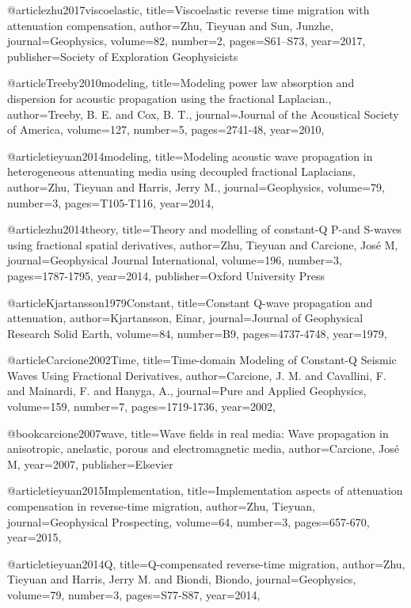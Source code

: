 @article{zhu2017viscoelastic,
  title={Viscoelastic reverse time migration with attenuation compensation},
  author={Zhu, Tieyuan and Sun, Junzhe},
  journal={Geophysics},
  volume={82},
  number={2},
  pages={S61--S73},
  year={2017},
  publisher={Society of Exploration Geophysicists}
}


@article{Treeby2010modeling,
  title={Modeling power law absorption and dispersion for acoustic propagation using the fractional Laplacian.},
  author={Treeby, B. E. and Cox, B. T.},
  journal={Journal of the Acoustical Society of America},
  volume={127},
  number={5},
  pages={2741-48},
  year={2010},
}

@article{tieyuan2014modeling,
  title={Modeling acoustic wave propagation in heterogeneous attenuating media using decoupled fractional Laplacians},
  author={Zhu, Tieyuan and Harris, Jerry M.},
  journal={Geophysics},
  volume={79},
  number={3},
  pages={T105-T116},
  year={2014},
}

@article{zhu2014theory,
  title={Theory and modelling of constant-{Q} {P}-and {S}-waves using fractional spatial derivatives},
  author={Zhu, Tieyuan and Carcione, Jos{\'e} M},
  journal={Geophysical Journal International},
  volume={196},
  number={3},
  pages={1787-1795},
  year={2014},
  publisher={Oxford University Press}
}


@article{Kjartansson1979Constant,
  title={Constant {Q}-wave propagation and attenuation},
  author={Kjartansson, Einar},
  journal={Journal of Geophysical Research Solid Earth},
  volume={84},
  number={B9},
  pages={4737-4748},
  year={1979},
}

@article{Carcione2002Time,
  title={Time-domain Modeling of Constant-{Q} Seismic Waves Using Fractional Derivatives},
  author={Carcione, J. M. and Cavallini, F. and Mainardi, F. and Hanyga, A.},
  journal={Pure and Applied Geophysics},
  volume={159},
  number={7},
  pages={1719-1736},
  year={2002},
}

@book{carcione2007wave,
  title={Wave fields in real media: Wave propagation in anisotropic, anelastic, porous and electromagnetic media},
  author={Carcione, Jos{\'e} M},
  year={2007},
  publisher={Elsevier}
}

@article{tieyuan2015Implementation,
  title={Implementation aspects of attenuation compensation in reverse‐time migration},
  author={Zhu, Tieyuan},
  journal={Geophysical Prospecting},
  volume={64},
  number={3},
  pages={657-670},
  year={2015},
}

@article{tieyuan2014Q,
  title={Q-compensated reverse-time migration},
  author={Zhu, Tieyuan and Harris, Jerry M. and Biondi, Biondo},
  journal={Geophysics},
  volume={79},
  number={3},
  pages={S77-S87},
  year={2014},
}

